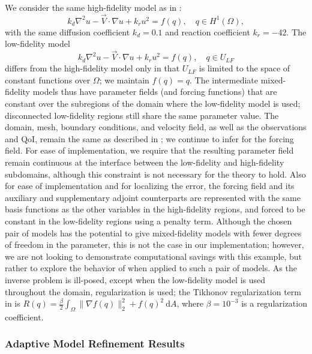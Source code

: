 \documentclass[review,sort&compress]{elsarticle}
\theoremstyle{plain} %
\theoremstyle{definition} %
\begin{document}
We consider the same high-fidelity model as in :
\begin{equation}
k_d\nabla^2 u - \vec{V}\cdot\nabla u + k_ru^2= f(q),\quad q\in H^1(\Omega),
\end{equation}
with the same diffusion coefficient $k_d = 0.1$  and reaction coefficient $k_r = -42$. The low-fidelity model
\begin{equation}
k_d\nabla^2 u - \vec{V}\cdot\nabla u + k_ru^2= f(q),\quad q\in U_{LF}
\end{equation}
differs from the high-fidelity model only in that $U_{LF}$ is limited to the space of constant functions over $\Omega$; we maintain $f(q)=q$. The intermediate mixed-fidelity models thus have parameter fields (and forcing functions) that are constant over the subregions of the domain where the low-fidelity model is used; disconnected low-fidelity regions still share the same parameter value. The domain, mesh, boundary conditions, and velocity field, as well as the observations and QoI, remain the same as described in ; we continue to infer for the forcing field. For ease of implementation, we require that the resulting parameter field remain continuous at the interface between the low-fidelity and high-fidelity subdomains, although this constraint is not necessary for the theory to hold. Also for ease of implementation and for localizing the error, the forcing field and its auxiliary and supplementary adjoint counterparts are represented with the same basis functions as the other variables in the high-fidelity regions, and forced to be constant in the low-fidelity regions using a penalty term. Although the chosen pair of models has the potential to give mixed-fidelity models with fewer degrees of freedom in the parameter, this is not the case in our implementation; however, we are not looking to demonstrate computational savings with this example, but rather to explore the behavior of  when applied to such a pair of models. As the inverse problem is ill-posed, except when the low-fidelity model is used throughout the domain, regularization is used; the Tikhonov regularization term in  is $R(q)=\frac{\beta}{2}\int_\Omega \|\nabla f(q)\|_2^2+f(q)^2\:\textrm{d}A$, where $\beta=10^{-3}$ is a regularization coefficient. 

\subsubsection{Adaptive Model Refinement Results}
\end{document}
